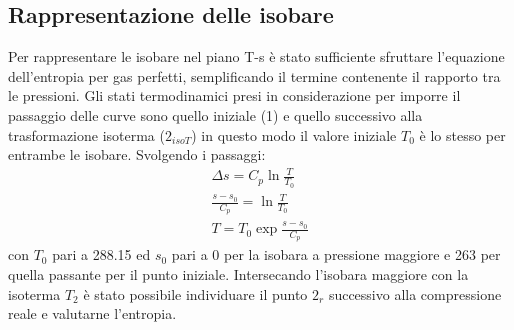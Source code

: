 \documentclass[a4paper,12pt]{article}
\begin{document}
\subsection{Rappresentazione delle isobare}
Per rappresentare le isobare nel piano T-s è stato sufficiente sfruttare l'equazione dell'entropia per gas perfetti,
semplificando il termine contenente il rapporto tra le pressioni. Gli stati termodinamici presi in considerazione
per imporre il passaggio delle curve sono quello iniziale (1) e quello successivo alla trasformazione isoterma ($2_{isoT}$)
in questo modo il valore iniziale $T_0$ è lo stesso per entrambe le isobare.
Svolgendo i passaggi:
\begin{gather*}
    \Delta s = C_p \ln \frac{T}{T_0} \\
    \frac{s - s_0}{C_p} = \ln\frac{T}{T_0} \\
    T = T_0 \exp \frac{s-s_0}{C_p}
\end{gather*}
con $T_0$ pari a 288.15 ed $s_0$ pari a 0 per la isobara a pressione maggiore e 263 per quella passante per il punto iniziale.
Intersecando l'isobara maggiore con la isoterma $T_2$ è stato possibile individuare il punto $2_r$ successivo alla compressione reale
e valutarne l'entropia.
\end{document}
